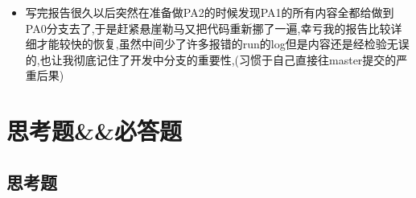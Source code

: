 \documentclass[UTF8,a4paper,10pt]{ctexart}
\begin{document}
{\begin{itemize}
\begin{todolist}
        \end{todolist}
        \item 写完报告很久以后突然在准备做PA2的时候发现PA1的所有内容全都给做到PA0分支去了,于是赶紧悬崖勒马又把代码重新挪了一遍,幸亏我的报告比较详细才能较快的恢复,虽然中间少了许多报错的run的log但是内容还是经检验无误的,也让我彻底记住了开发中分支的重要性,(习惯于自己直接往master提交的严重后果)
    \end{itemize}
}
\section{思考题\&\&必答题}
\subsection{思考题}
\end{document}
